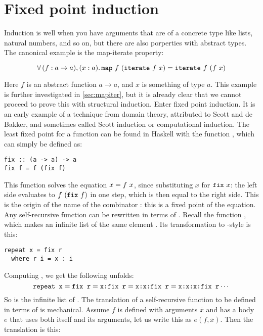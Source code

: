 \section{Fixed point induction}
\label{sec:fixpoint}

Induction is well when you have arguments that are of a concrete type
like lists, natural numbers, and so on, but there are also porperties
with abstract types. The canonical example is the map-iterate property:

\begin{equation*}
\faa{(f : a \rightarrow a)}{(x : a)} \hs{map} \w f \w (\hs{iterate} \w f \w x) \eq
           \hs{iterate} \w f \w (f \w x)
\end{equation*}

Here $f$ is an abstract function $a \rightarrow a$, and $x$ is
something of type $a$. This example is further investigated in
\ref{sec:mapiter}, but it is already clear that we cannot proceed to
prove this with structural induction.  Enter fixed point induction. It
is an early example of a technique from domain theory, attributed to
Scott and de Bakker,
and sometimes called Scott induction
or computational induction.  \cite{domains} The least fixed point for
a function can be found in Haskell with the function , which
can simply be defined as:

\begin{verbatim}
fix :: (a -> a) -> a
fix f = f (fix f)
\end{verbatim}

This function solves the equation $x = f \,\, x$, since substituting $x$
for $\hs{fix} \w x$: the left side evaluates to $f \w (\hs{fix} \w f)$
in one step, which is then equal to the right side. This is the origin
of the name of the combinator : this is a fixed point of the
equation.  Any self-recursive function can be rewritten in terms of
. Recall the  function , which makes an
infinite list of the same element . Its
transformation to -style is this:

\begin{verbatim}
repeat x = fix r
  where r i = x : i
\end{verbatim}

Computing , we get the following unfolds:
\begin{equation*}
  \hs{repeat x}
= \hs{fix r}
= \hs{x:fix r}
= \hs{x:x:fix r}
= \hs{x:x:x:fix r}
  \cdots
\end{equation*}
So  is the infinite list of . The translation of a
self-recursive function to be defined in terms of  is
mechanical. Assume $f$ is defined with arguments $\overline{x}$ and
has a body $e$ that uses both itself and its arguments, let us write
this as $e(f,\overline{x})$. Then the translation is this:

